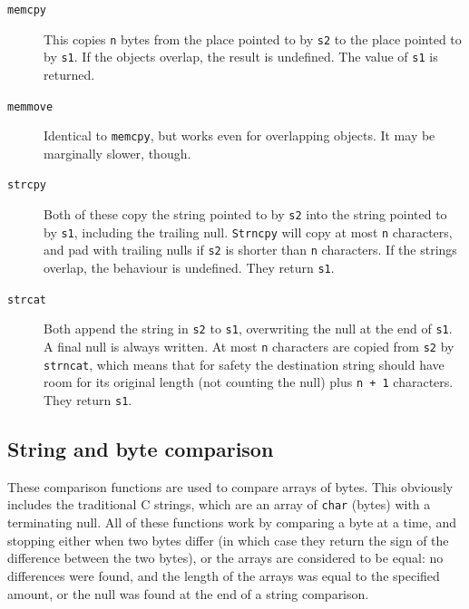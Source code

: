    \begin{description}
    \item[\texttt{memcpy}] This copies \texttt{n} bytes from the place pointed to  by
     \texttt{s2}  to the  place pointed to by \texttt{s1}.  If the
     objects overlap, the result is undefined.  The value of \texttt{s1} is
     returned.

    \item[\texttt{memmove}] Identical to  \texttt{memcpy},  but  works  even  for  overlapping
     objects.  It may be marginally slower, though.

    \item[\texttt{strcpy}] Both of these copy the string pointed to by \texttt{s2}  into  the
     string  pointed  to  by \texttt{s1}, including the  trailing null.
     \texttt{Strncpy} will copy at most  \texttt{n}  characters,  and
     pad  with trailing  nulls  if  \texttt{s2} is shorter than
     \texttt{n} characters.  If the strings overlap, the behaviour  is
     undefined.   They return \texttt{s1}.

    \item[\texttt{strcat}] Both append the string in \texttt{s2} to \texttt{s1},
     overwriting the  null at  the  end  of \texttt{s1}.  A final null is
     always written.  At most \texttt{n} characters are copied from
     \texttt{s2}  by  \texttt{strncat},  which means  that for safety
     the destination string should have room for its original length (not
     counting the null) plus \texttt{n + 1} characters.  They return
     \texttt{s1}.
   \end{description}

  

  \subsection{String and byte comparison}
   

   These comparison functions are used to compare arrays of bytes.  This
    obviously includes the traditional C strings, which are an array of
    \texttt{char} (bytes) with a terminating null.  All of these functions
    work by comparing a byte at a time, and stopping either when two bytes
    differ (in which case they return the sign of the difference between the
    two bytes), or the arrays are considered to be equal: no differences were
    found, and the length of the arrays was equal to the specified amount, or
    the null was found at the end of a string comparison.


